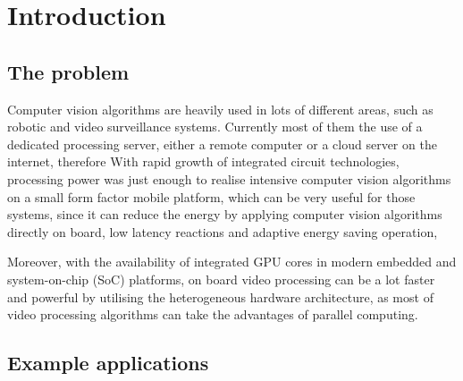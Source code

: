 \chapter{Introduction} \label{Chapter:Introduction}

\iffalse
1-1.5 pages
\fi

\section{The problem}

\iffalse
\fi

Computer vision algorithms are heavily used in lots of different areas, such as robotic and video surveillance systems. Currently most of them  the use of a dedicated processing server, either a remote computer or a cloud server on the internet, therefore  With rapid growth of integrated circuit technologies, processing power was just enough to realise  intensive computer vision algorithms on a small form factor mobile platform, which can be very useful for those systems, since it can  reduce the energy  by applying computer vision algorithms directly on board,  low latency reactions and adaptive energy saving operation, 

Moreover, with the availability of integrated GPU cores in modern embedded and system-on-chip (SoC) platforms, on board video processing can be a lot faster and  powerful by utilising the heterogeneous hardware architecture, as most of video processing algorithms can take the advantages of parallel computing.


\section{Example applications} %

